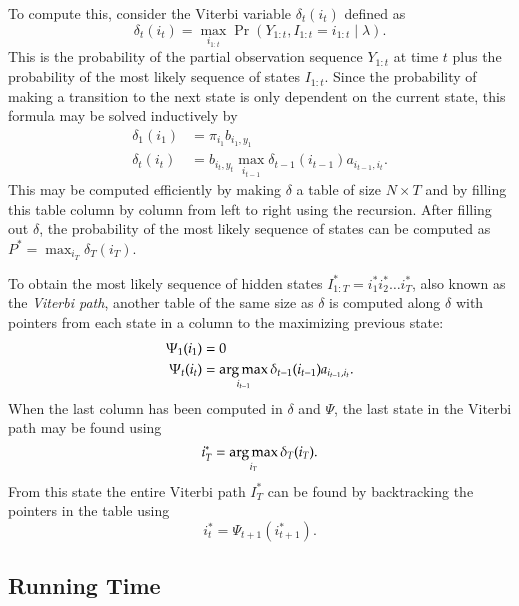 To compute this, consider the Viterbi variable $\delta_t(i_t)$ defined as
\begin{equation*}
  \delta_t(i_t) = \max_{i_{1:t}} \Pr(Y_{1:t}, I_{1:t} = i_{1:t} \mid \lambda).
\end{equation*}
This is the probability of the partial observation sequence $Y_{1:t}$ at time
$t$ plus the probability of the most likely sequence of states $I_{1:t}$. Since
the probability of making a transition to the next state is only dependent on
the current state, this formula may be solved inductively by
\begin{equation}
  \label{eq:1}
  \begin{aligned}
    \delta_1(i_1) &= \pi_{i_1} b_{i_1, y_1} \\
    \delta_t(i_t) &= b_{i_t, y_t} \max_{i_{t - 1}} \delta_{t - 1}(i_{t - 1}) a_{i_{t - 1}, i_t}.
  \end{aligned}
\end{equation}
This may be computed efficiently by making $\delta$ a table of size
$N \times T$ and by filling this table column by column from left to right
using the recursion. After filling out $\delta$,
the probability of the most likely sequence of states can be computed as
$P^* = \max_{i_T} \delta_T(i_T)$.

To obtain the most likely sequence of hidden states
$I_{1:T}^* = i_1^*i_2^*\dots{}i_T^*$, also known as the \emph{Viterbi path},
another table of the same size as $\delta$ is computed along $\delta$ with
pointers from each state in a column to the maximizing previous state:
\begin{equation*}
  \begin{aligned}
    \Psi_1(i_1) &= 0 \\
    \Psi_t(i_t) &= \operatorname*{arg\,max}_{i_{t - 1}} \delta_{t - 1}(i_{t - 1}) a_{i_{t - 1}, i_t}.
  \end{aligned}
\end{equation*}
When the last column has been computed in $\delta$ and $\Psi$, the last state
in the Viterbi path may be found using
\begin{equation*}
  i_T^* = \operatorname*{arg\,max}_{i_T} \delta_T(i_T).
\end{equation*}
From this state the entire Viterbi path $I_T^*$ can be found by backtracking
the pointers in the table using
\begin{equation*}
  i_t^* = \Psi_{t + 1}(i_{t + 1}^*).
\end{equation*}

\subsection{Running Time}

